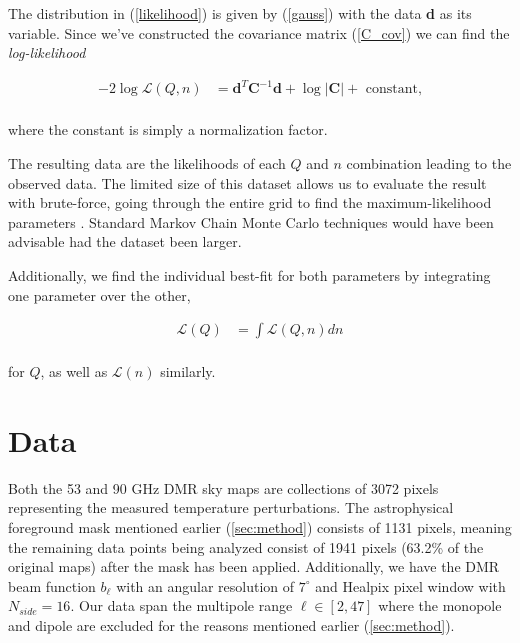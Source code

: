 \documentclass{emulateapj}
\begin{document}
The distribution in (\ref{likelihood}) is given by (\ref{gauss}) with the data \textbf{d} as its variable. Since we've constructed the covariance matrix (\ref{C_cov}) we can find the \textit{log-likelihood} 

 
\begin{equation}
\label{lnL}
\begin{array}{rl}
-2\log\mathcal{L}(Q,n) &= \textbf{d}^T\textbf{C}^{-1}\textbf{d} + \log|\textbf{C}| + \text{ constant,}  \\ 
\end{array}
\end{equation}

\noindent 
where the constant is simply a normalization factor.

The resulting data are the likelihoods of each $Q$ and $n$ combination leading to the observed data. The limited size of this dataset allows us to evaluate the result with brute-force, going through the entire grid to find the maximum-likelihood parameters%
. Standard Markov Chain Monte Carlo techniques would have been advisable had the dataset been larger.

Additionally, we find the individual best-fit for both parameters by integrating one parameter over the other,

\begin{equation}
\label{lQ}
\begin{array}{rl}
\mathcal{L}(Q) &= \int \mathcal{L}(Q,n)dn  \\ 
\end{array}
\end{equation}  

\noindent 
for $Q$, as well as $\mathcal{L}(n)$ similarly.

 

\section{Data}
\label{sec:data}


Both the 53 and 90 GHz DMR sky maps are collections of 3072 pixels representing the measured temperature perturbations. The astrophysical foreground mask mentioned earlier (\ref{sec:method}) consists of 1131 pixels, meaning the remaining data points being analyzed consist of 1941 pixels (63.2\% of the original maps) after the mask has been applied. Additionally, we have the DMR beam function $b_{\ell}$ with an angular resolution of $7^{\circ}$ and Healpix pixel window with $N_{side} = 16$. Our data span the multipole range $\ell \in [2,47]$ where the monopole and dipole are excluded for the reasons mentioned earlier (\ref{sec:method}).  
\end{document}
